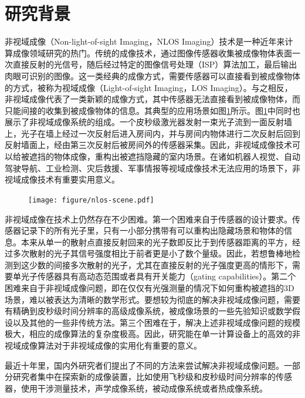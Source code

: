\documentclass[master]{shtthesis}             %
\begin{document}
\section{研究背景}\label{sec:backgd}

非视域成像（Non-light-of-sight Imaging，NLOS Imaging）技术是一种近年来计算成像领域研究的热门。传统的成像技术，通过图像传感器收集被成像物体表面一次直接反射的光信号，随后经过特定的图像信号处理（ISP）算法加工，最后输出肉眼可识别的图像。这一类经典的成像方式，需要传感器可以直接看到被成像物体的方式，被称为视域成像（Light-of-sight Imaging，LOS Imaging）。与之相反，非视域成像代表了一类新颖的成像方式，其中传感器无法直接看到被成像物体，而只能间接的收集到被成像物体的信息。其典型的应用场景如图\ref{fig:nlos_scene}所示。图\ref{fig:nlos_scene}中同时也展示了非视域成像系统的组成。一个皮秒级激光器发射一束光子流到一面反射墙上，光子在墙上经过一次反射后进入房间内，并与房间内物体进行二次反射后回到反射墙面上，经由第三次反射后被房间外的传感器采集。因此，非视域成像技术可以给被遮挡的物体成像，重构出被遮挡隐藏的室内场景。在诸如机器人视觉、自动驾驶导航、工业检测、灾后救援、军事情报等视域成像技术无法应用的场景下，非视域成像技术有重要实用意义。%

\begin{figure}[tb]
  \centering
  \texttt{[image: figure/nlos-scene.pdf]}
  \label{fig:nlos_scene}
\end{figure}

非视域成像在技术上仍然存在不少困难。第一个困难来自于传感器的设计要求。传感器记录下的所有光子里，只有一小部分携带有可以重构出隐藏场景和物体的信息。本来从单一的散射点直接反射回来的光子数即反比于到传感器距离的平方，经过多次散射的光子其信号强度相比于前者更是小了数个量级。因此，若想鲁棒地检测到这少数的间接多次散射的光子，尤其在直接反射的光子强度更高的情形下，需要单光子传感器具有高动态范围或者具有开关能力（gating capabilities）。第二个困难来自于非视域成像问题，即在仅仅有光强测量的情况下如何重构被遮挡的3D场景，难以被表达为清晰的数学形式。要想较为彻底的解决非视域成像问题，需要有精确到皮秒级时间分辨率的高级成像系统，被成像场景的一些先验知识或数学假设以及其他的一些非传统方法。第三个困难在于，解决上述非视域成像问题的规模极大，相应的成像算法的复杂度极高。因此，研究能在单一计算设备上的高效的非视域成像算法对于非视域成像的实用化有重要的意义。

最近十年里，国内外研究者们提出了不同的方法来尝试解决非视域成像问题。一部分研究者集中在探索新的成像装置，比如使用飞秒级和皮秒级时间分辨率的传感器\citep{Velten2012,Otoole2018,Liu2019,DavidB.Lindell2019}，使用干涉测量技术\citep{bertolotti2012non,katz2014non}，声学成像系统\citep{lindell2019acoustic}，被动成像系统\citep{bouman2017turning,saunders2019computational,boger2019passive}或者热成像系统。
\end{document}
